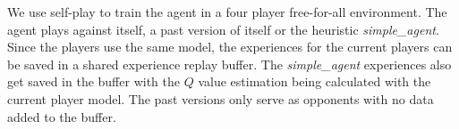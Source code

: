 
We use self-play to train the agent in a four player free-for-all environment. The agent plays against itself, a past version of itself or the heuristic \emph{simple\_agent}. Since the players use the same model, the experiences for the current players can be saved in a shared experience replay buffer. The \emph{simple\_agent} experiences also get saved in the buffer with the $Q$ value estimation being calculated with the current player model. The past versions only serve as opponents with no data added to the buffer.

